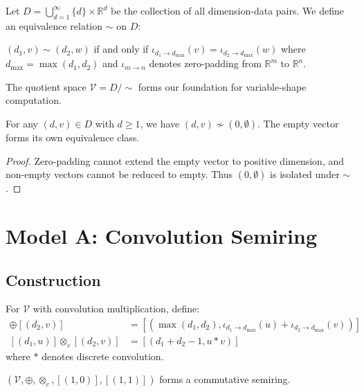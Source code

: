 \documentclass[sigconf,review]{acmart}
\begin{document}
Let $D = \bigcup_{d=1}^{\infty} \{d\} \times \mathbb{R}^d$ be the collection of all dimension-data pairs. We define an equivalence relation $\sim$ on $D$:

\begin{definition}
$(d_1, v) \sim (d_2, w)$ if and only if $\iota_{d_1 \to d_{\max}}(v) = \iota_{d_2 \to d_{\max}}(w)$ where $d_{\max} = \max(d_1, d_2)$ and $\iota_{m \to n}$ denotes zero-padding from $\mathbb{R}^m$ to $\mathbb{R}^n$.
\end{definition}

The quotient space $\mathcal{V} = D/\sim$ forms our foundation for variable-shape computation.

\begin{lemma}
For any $(d,v) \in D$ with $d \geq 1$, we have $(d,v) \nsim (0, \emptyset)$. The empty vector forms its own equivalence class.
\end{lemma}
\begin{proof}
Zero-padding cannot extend the empty vector to positive dimension, and non-empty vectors cannot be reduced to empty. Thus $(0, \emptyset)$ is isolated under $\sim$.
\end{proof}

\section{Model A: Convolution Semiring}
\label{sec:modelA}

\subsection{Construction}

For $\mathcal{V}$ with convolution multiplication, define:
\begin{align}
[(d_1,u)] \oplus [(d_2,v)] &= [(\max(d_1,d_2), \iota_{d_1 \to d_{\max}}(u) + \iota_{d_2 \to d_{\max}}(v))] \\
[(d_1,u)] \otimes_c [(d_2,v)] &= [(d_1+d_2-1, u * v)]
\end{align}
where $*$ denotes discrete convolution.

\begin{theorem}
\label{thm:conv-semiring}
$(\mathcal{V}, \oplus, \otimes_c, [(1,0)], [(1,1)])$ forms a commutative semiring.
\end{theorem}
\end{document}
